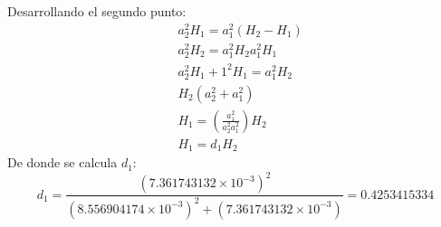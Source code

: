     Desarrollando el segundo punto:
    \begin{align*}
        &a_2^2H_1 = a_1^2\left(H_2 - H_1\right)\\
        &a_2^2H_2 = a_1^2H_2 a_1^2H_1\\
        &a_2^2H_1 + 1^2H_1 = a_1^2H_2\\
        &H_2\left(a_2^2 + a_1^2\right)\\
        &H_1 =\left(\frac{a_1^2}{a_2^2 a_1^2}\right)H_2\\
        &H_1 = d_1 H_2
    \end{align*}
    De donde se calcula $d_1$:
    \begin{equation*}
        d_1 =\frac{\left(7.361743132 \times 10^{ - 3}\right)^2}{\left(8.556904174\times 10^{ - 3}\right)^2 + \left(7.361743132 \times 10^{ - 3} \right)} = 0.4253415334
    \end{equation*}
    
